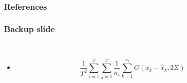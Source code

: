 \backupbegin

\begin{frame}[allowframebreaks]
  \frametitle{References}
  
  
\end{frame}

\begin{frame}
  \frametitle{Backup slide}
  \begin{description}[]
  \item[Crispness score formula] \hfill \\
  \begin{itemize}
  \item $$\frac{1}{T^2}\sum_{i=1}^T\sum_{j=1}^T\frac{1}{n_i}\sum_{k=1}^{n_i}G(x_k-\hat{x}_k,2\Sigma)$$
  \end{itemize}
  \end{description}
\end{frame}

\backupend


